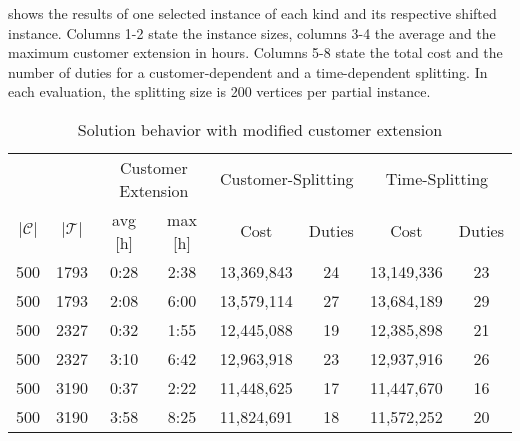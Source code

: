  shows the results of one selected instance of each kind and its respective shifted instance. Columns 1-2 state the instance sizes, columns 3-4 the average and the maximum customer extension in hours. Columns 5-8 state the total cost and the number of duties for a customer-dependent and a time-dependent splitting. In each evaluation, the splitting size is 200 vertices per partial instance.

\begin{table}[htb]
	\centering
	\begin{tabular}{cccc cc cc}
		\toprule
		&& \multicolumn{2}{c}{Customer Extension} & \multicolumn{2}{c}{Customer-Splitting} & \multicolumn{2}{c}{Time-Splitting} \\
		\cmidrule(r){3-8}
		$\vert\mathcal{C}\vert$ & $\vert\mathcal{T}\vert$ & avg [h] & max [h] & Cost & Duties & Cost & Duties \\
		\midrule
		500 & 1793 & 0:28 & 2:38 & 13,369,843 & 24 & 13,149,336 & 23 \\
		500 & 1793 & 2:08 & 6:00 & 13,579,114 & 27 & 13,684,189 & 29 \\
		500 & 2327 & 0:32 & 1:55 & 12,445,088 & 19 & 12,385,898 & 21 \\
		500 & 2327 & 3:10 & 6:42 & 12,963,918 & 23 & 12,937,916 & 26 \\
		500 & 3190 & 0:37 & 2:22 & 11,448,625 & 17 & 11,447,670 & 16 \\
		500 & 3190 & 3:58 & 8:25 & 11,824,691 & 18 & 11,572,252 & 20 \\
		\bottomrule
	\end{tabular}
	\caption{Solution behavior with modified customer extension}
	\label{tab:results:extension}
\end{table}


